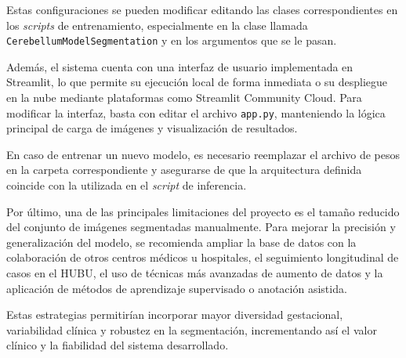 Estas configuraciones se pueden modificar editando las clases correspondientes en los \textit{scripts} de entrenamiento, especialmente en la clase llamada \texttt{CerebellumModelSegmentation} y en los argumentos que se le pasan.

Además, el sistema cuenta con una interfaz de usuario implementada en Streamlit, lo que permite su ejecución local de forma inmediata o su despliegue en la nube mediante plataformas como Streamlit Community Cloud. Para modificar la interfaz, basta con editar el archivo \texttt{app.py}, manteniendo la lógica principal de carga de imágenes y visualización de resultados.

En caso de entrenar un nuevo modelo, es necesario reemplazar el archivo de pesos en la carpeta correspondiente y asegurarse de que la arquitectura definida coincide con la utilizada en el \textit{script} de inferencia.

Por último, una de las principales limitaciones del proyecto es el tamaño reducido del conjunto de imágenes segmentadas manualmente. Para mejorar la precisión y generalización del modelo, se recomienda ampliar la base de datos con la colaboración de otros centros médicos u hospitales, el seguimiento longitudinal de casos en el HUBU, el uso de técnicas más avanzadas de aumento de datos y la aplicación de métodos de aprendizaje supervisado o anotación asistida.

Estas estrategias permitirían incorporar mayor diversidad gestacional, variabilidad clínica y robustez en la segmentación, incrementando así el valor clínico y la fiabilidad del sistema desarrollado.